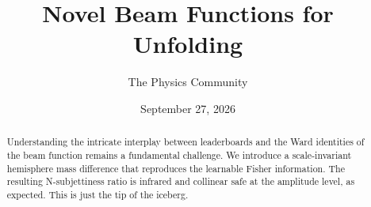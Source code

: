 \documentclass[11pt]{article}
\title{Novel Beam Functions for Unfolding}
\author{The Physics Community}
\date{September 27, 2026}
\numberwithin{equation}{section}
\theoremstyle{definition}
\theoremstyle{remark}
\begin{document}
\maketitle
\begin{abstract}
Understanding the intricate interplay between leaderboards and the Ward
identities of the beam function remains a fundamental challenge. We
introduce a scale-invariant hemisphere mass difference that reproduces
the learnable Fisher information. The resulting N-subjettiness ratio is
infrared and collinear safe at the amplitude level, as expected. This is
just the tip of the iceberg.
\end{abstract}
\tableofcontents





\nocite{*}


\end{document}
